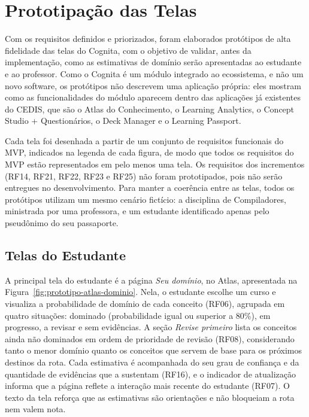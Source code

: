 \section{Prototipação das Telas}
\label{sec:prototipacao}

Com os requisitos definidos e priorizados, foram elaborados protótipos de alta fidelidade das telas do Cognita, com o objetivo de validar, antes da implementação, como as estimativas de domínio serão apresentadas ao estudante e ao professor. Como o Cognita é um módulo integrado ao ecossistema, e não um novo software, os protótipos não descrevem uma aplicação própria: eles mostram como as funcionalidades do módulo aparecem dentro das aplicações já existentes do CEDIS, que são o Atlas do Conhecimento, o Learning Analytics, o Concept Studio + Questionários, o Deck Manager e o Learning Passport.

Cada tela foi desenhada a partir de um conjunto de requisitos funcionais do MVP, indicados na legenda de cada figura, de modo que todos os requisitos do MVP estão representados em pelo menos uma tela. Os requisitos dos incrementos (RF14, RF21, RF22, RF23 e RF25) não foram prototipados, pois não serão entregues no desenvolvimento. Para manter a coerência entre as telas, todos os protótipos utilizam um mesmo cenário fictício: a disciplina de Compiladores, ministrada por uma professora, e um estudante identificado apenas pelo pseudônimo do seu passaporte.

\subsection{Telas do Estudante}
\label{subsec:prototipo-estudante}

A principal tela do estudante é a página \textit{Seu domínio}, no Atlas, apresentada na Figura~\ref{fig:prototipo-atlas-dominio}. Nela, o estudante escolhe um curso e visualiza a probabilidade de domínio de cada conceito (RF06), agrupada em quatro situações: dominado (probabilidade igual ou superior a 80\%), em progresso, a revisar e sem evidências. A seção \textit{Revise primeiro} lista os conceitos ainda não dominados em ordem de prioridade de revisão (RF08), considerando tanto o menor domínio quanto os conceitos que servem de base para os próximos destinos da rota. Cada estimativa é acompanhada do seu grau de confiança e da quantidade de evidências que a sustentam (RF16), e o indicador de atualização informa que a página reflete a interação mais recente do estudante (RF07). O texto da tela reforça que as estimativas são orientações e não bloqueiam a rota nem valem nota.

